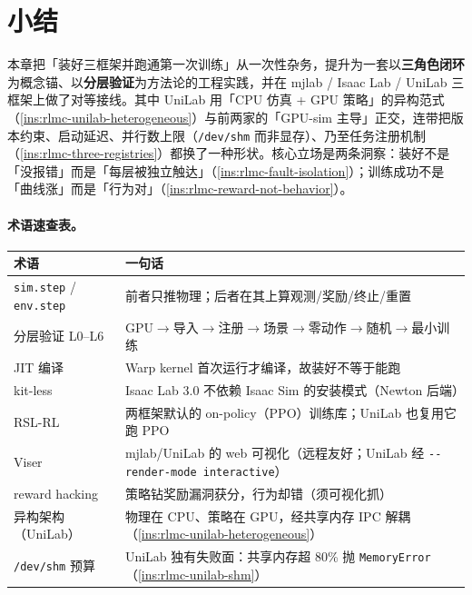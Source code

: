 \section{小结}
\label{sec:rlmc-setup-summary}

本章把「装好三框架并跑通第一次训练」从一次性杂务，提升为一套以\textbf{三角色闭环}为概念锚、以\textbf{分层验证}为方法论的工程实践，并在 mjlab / Isaac Lab / UniLab 三框架上做了对等接线。其中 UniLab 用「CPU 仿真 + GPU 策略」的异构范式（\cref{ins:rlmc-unilab-heterogeneous}）与前两家的「GPU-sim 主导」正交，连带把版本约束、启动延迟、并行数上限（\verb|/dev/shm| 而非显存）、乃至任务注册机制（\cref{ins:rlmc-three-registries}）都换了一种形状。核心立场是两条洞察：装好不是「没报错」而是「每层被独立触达」（\cref{ins:rlmc-fault-isolation}）；训练成功不是「曲线涨」而是「行为对」（\cref{ins:rlmc-reward-not-behavior}）。

\paragraph{术语速查表。}

\begin{center}
\small
\begin{tabular}{@{}ll@{}}
\toprule
术语 & 一句话 \\
\midrule
\verb|sim.step| / \verb|env.step| & 前者只推物理；后者在其上算观测/奖励/终止/重置 \\
分层验证 L0--L6 & GPU$\to$导入$\to$注册$\to$场景$\to$零动作$\to$随机$\to$最小训练 \\
JIT 编译 & Warp kernel 首次运行才编译，故装好不等于能跑 \\
kit-less & Isaac Lab 3.0 不依赖 Isaac Sim 的安装模式（Newton 后端） \\
RSL-RL & 两框架默认的 on-policy（PPO）训练库；UniLab 也复用它跑 PPO \\
Viser & mjlab/UniLab 的 web 可视化（远程友好；UniLab 经 \texttt{-{}-render-mode interactive}） \\
reward hacking & 策略钻奖励漏洞获分，行为却错（须可视化抓） \\
异构架构（UniLab）& 物理在 CPU、策略在 GPU，经共享内存 IPC 解耦（\cref{ins:rlmc-unilab-heterogeneous}） \\
\verb|/dev/shm| 预算 & UniLab 独有失败面：共享内存超 80\% 抛 \texttt{MemoryError}（\cref{ins:rlmc-unilab-shm}） \\
\bottomrule
\end{tabular}
\end{center}

